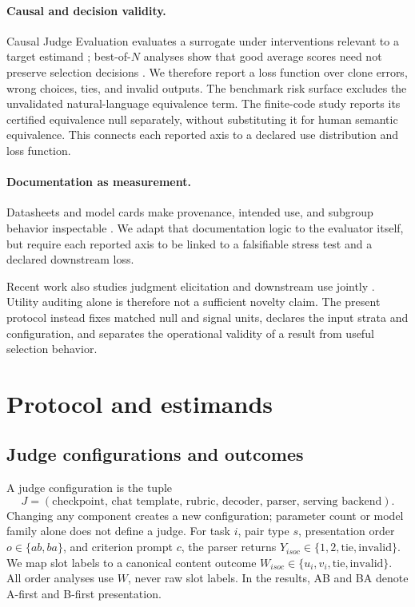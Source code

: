 \documentclass[10pt]{article}
\begin{document}
\paragraph{Causal and decision validity.}
Causal Judge Evaluation evaluates a surrogate under interventions relevant to a target estimand \citep{landesberg2026causal}; best-of-$N$ analyses show that good average scores need not preserve selection decisions \citep{landesberg2026bestofn}. We therefore report a loss function over clone errors, wrong choices, ties, and invalid outputs. The benchmark risk surface excludes the unvalidated natural-language equivalence term. The finite-code study reports its certified equivalence null separately, without substituting it for human semantic equivalence. This connects each reported axis to a declared use distribution and loss function.

\paragraph{Documentation as measurement.}
Datasheets and model cards make provenance, intended use, and subgroup behavior inspectable \citep{gebru2018datasheets,mitchell2018modelcards}. We adapt that documentation logic to the evaluator itself, but require each reported axis to be linked to a falsifiable stress test and a declared downstream loss.

Recent work also studies judgment elicitation and downstream use jointly \citep{zhang2026judgment}. Utility auditing alone is therefore not a sufficient novelty claim. The present protocol instead fixes matched null and signal units, declares the input strata and configuration, and separates the operational validity of a result from useful selection behavior.

\section{Protocol and estimands}

\subsection{Judge configurations and outcomes}

A judge configuration is the tuple
\[
J=(\text{checkpoint, chat template, rubric, decoder, parser, serving backend}).
\]
Changing any component creates a new configuration; parameter count or model family alone does not define a judge. For task $i$, pair type $s$, presentation order $o\in\{ab,ba\}$, and criterion prompt $c$, the parser returns $Y_{isoc}\in\{1,2,\mathrm{tie},\mathrm{invalid}\}$. We map slot labels to a canonical content outcome $W_{isoc}\in\{u_i,v_i,\mathrm{tie},\mathrm{invalid}\}$. All order analyses use $W$, never raw slot labels. In the results, AB and BA denote A-first and B-first presentation.
\end{document}
